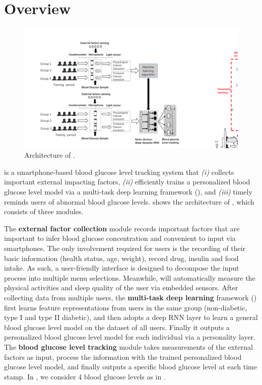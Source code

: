 
\section{Overview}
\label{sec:overview}

\begin{figure}[h]
  \centering
  \includegraphics[width=0.85\columnwidth]{./img/System_Arch1.pdf}
  \caption{Architecture of \sysname. }
  \label{fig:architecture}
\end{figure}

\sysname is a smartphone-based blood glucose level tracking system that \emph{(i)} collects important external impacting factors, \emph{(ii)} efficiently trains a personalized blood glucose level model via a multi-task deep learning framework (\modelname), and \emph{(iii)} timely reminds users of abnormal blood glucose levels.
 shows the architecture of \sysname, which consists of three modules.

The \textbf{external factor collection} module records important factors that are important to infer blood glucose concentration and convenient to input via smartphones.
The only involvement required for users is the recording of their basic information (\eg health status, age, weight), record drug, insulin and food intake. As such, a user-friendly interface is designed to decompose the input process into multiple menu selections. 
Meanwhile, \sysname will automatically measure the physical activities and sleep quality of the user via embedded sensors.
After collecting data from multiple users, the \textbf{multi-task deep learning} framework (\modelname) first learns feature representations from users in the same group (non-diabetic, type I and type II diabetic), and then adopts a deep RNN layer to learn a general blood glucose level model on the dataset of all users.
Finally it outputs a personalized blood glucose level model for each individual via a personality layer.
The \textbf{blood glucose level tracking} module takes measurements of the external factors as input, process the information with the trained personalized blood glucose level model, and finally outputs a specific blood glucose level at each time stamp.
In \sysname, we consider 4 blood glucose levels as in .

